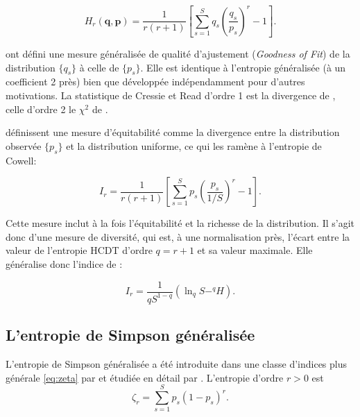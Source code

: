\documentclass[
  11pt,
  french,
  a4paper,
  extrafontsizes,onecolumn,openright
  ]{memoir}
\begin{document}
\begin{equation}
  \label{eq:Maasoumi1993}
  H_r\left(\mathbf{q},\mathbf{p}\right) = \frac{1}{r\left(r+1\right)}\left[\sum^S_{s=1}{q_s{\left(\frac{q_s}{p_s}\right)}^{r}}-1\right].
\end{equation}

\textcite{Cressie1984} ont défini une mesure généralisée de qualité d'ajustement (\emph{Goodness of Fit}) de la distribution \(\{q_s\}\) à celle de \(\{p_s\}\).
Elle est identique à l'entropie généralisée (à un coefficient 2 près) bien que développée indépendamment pour d'autres motivations.
La statistique de Cressie et Read d'ordre 1 est la divergence de \textcite{Kullback1951}, celle d'ordre 2 le \(\chi^2\) de \textcite{Pearson1900}.

\textcite{Studeny2011} définissent une mesure d'équitabilité comme la divergence entre la distribution observée \(\{p_s\}\) et la distribution uniforme, ce qui les ramène à l'entropie de Cowell:

\begin{equation}
  \label{eq:Studeny2011}
  I_r 
  = \frac{1}{r\left(r+1\right)} \left[\sum^S_{s=1}{p_s \left(\frac{p_s}{1/S} \right)^{r}-1 } \right].
\end{equation}

Cette mesure inclut à la fois l'équitabilité et la richesse de la distribution.
Il s'agit donc d'une mesure de diversité, qui est, à une normalisation près, l'écart entre la valeur de l'entropie HCDT d'ordre \(q=r+1\) et sa valeur maximale.
Elle généralise donc l'indice de \textcite{Theil1967}:

\begin{equation}
  \label{eq:TheilGen}
  I_r = \frac{1}{q S^{1-q}}\left( \ln_q{S} - ^{q}\!H \right).
\end{equation}

\hypertarget{sec-SimpsonG}{%
\subsection{L'entropie de Simpson généralisée}\label{sec-SimpsonG}}

L'entropie de Simpson généralisée a été introduite dans une classe d'indices plus générale \eqref{eq:zeta} par \textcite{Zhang2010} et étudiée en détail par \textcite{Zhang2014}.
L'entropie d'ordre \(r>0\) est
\begin{equation}
  \label{eq:zetar}
  \zeta_r = \sum_{s=1}^S p_s (1-p_s)^r.
\end{equation}
\end{document}
